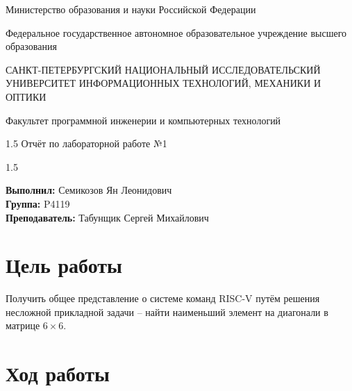 \documentclass[14pt]{extarticle}
\begin{document}
\begin{center}

Министерство образования и науки Российской Федерации \\ \vspace{0.5cm}

Федеральное государственное автономное образовательное учреждение высшего образования \\ \vspace{1cm}

САНКТ-ПЕТЕРБУРГСКИЙ НАЦИОНАЛЬНЫЙ ИССЛЕДОВАТЕЛЬСКИЙ УНИВЕРСИТЕТ ИНФОРМАЦИОННЫХ ТЕХНОЛОГИЙ, МЕХАНИКИ И ОПТИКИ \\ \vspace{1cm}

Факультет программной инженерии и компьютерных технологий \\ \vspace{1cm}

\begin{spacing}{1.5}
Отчёт по лабораторной работе №1 \\
\end{spacing}

\end{center}

\vspace{3cm}

\begin{spacing}{1.5}
\begin{flushright}
\textbf{Выполнил:} Семикозов Ян Леонидович \\
\textbf{Группа:} P4119 \\
\textbf{Преподаватель:} Табунщик Сергей Михайлович \\
\end{flushright}
\end{spacing}

\thispagestyle{empty}
\clearpage
\setcounter{page}{1}

\section{Цель работы}
Получить общее представление о системе команд RISC-V путём решения несложной прикладной задачи -- найти наименьший элемент на диагонали в матрице $6\times6$.

\section{Ход работы}
\end{document}
